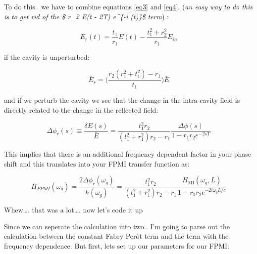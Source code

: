 \documentclass[11pt]{article}
\begin{document}
To do this.. we have to combine equations \ref{eq3} and \ref{eq4}.
(\emph{an easy way to do this is to get rid of the \$ r\_2 E(t - 2T)
e\^{}\{-i \Delta \phi(t)\}\$ term}) :

\[ E_r(t) = \frac{t_1}{r_1}E(t) - \frac{t_1^2 + r_2^2}{r_1} E_{in}\]

if the cavity is unperturbed:

\[ \bar{E}_r = \bigg(\frac{r_2(r_1^2 + t_1^2) - r_1}{t_1} \bigg) \bar{E} \]

and if we perturb the cavity we see that the change in the intra-cavity
field is directly related to the change in the reflected field:

\[ \Delta \phi_r(s) \equiv \frac{\delta E(s)}{\bar{E}} = \frac{t_1^2r_2}{(t_1^2 + r_1^2)r_2 -r_1} \frac{\Delta \phi(s)}{1-r_1r_2e^{-2sT}}\]

This implies that there is an additional frequency dependent factor in
your phase shift and this translates into your FPMI transfer function
as:

\[ H_{FPMI}(\omega_g) = \frac{2 \Delta \phi_r(\omega_g)}{h(\omega_g)} =  \frac{t_1^2r_2}{(t_1^2 + r_1^2)r_2 -r_1} \frac{H_{\mathrm{MI}}(\omega_g, L)}{1-r_1r_2e^{-2i \omega_g L /c }}  \]

Whew\ldots. that was a lot\ldots. now let's code it up

    Since we can seperate the calculation into two.. I'm going to parse out
the calculation between the constant Fabry Perót term and the term with
the frequency dependence. But first, lets set up our parameters for our
FPMI:
\end{document}
